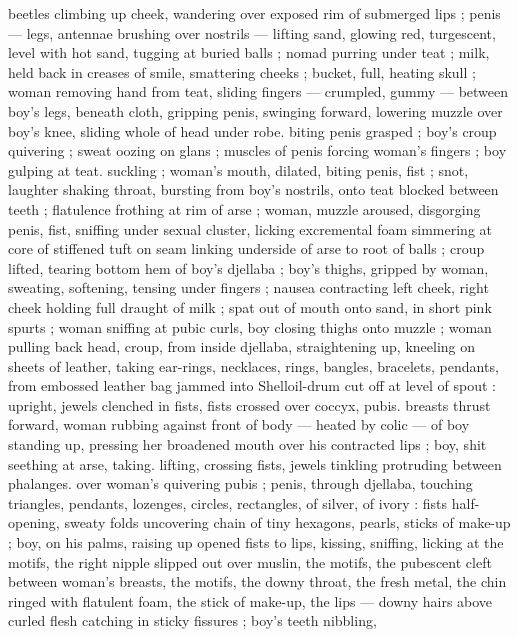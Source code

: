beetles climbing up cheek, wandering over exposed rim of 
submerged lips ; penis --- legs, antennae brushing over nostrils --- 
lifting sand, glowing red, turgescent, level with hot sand, tugging at 
buried balls ; nomad purring under teat ; milk, held back in creases 
of smile, smattering cheeks ; bucket, full, heating skull ; woman 
removing hand from teat, sliding fingers --- crumpled, gummy --- 
between boy's legs, beneath cloth, gripping penis, swinging forward, 
lowering muzzle over boy's knee, sliding whole of head under robe. 
biting penis grasped ; boy's croup quivering ; sweat oozing on glans 
; muscles of penis forcing woman's fingers ; boy gulping at teat. 
suckling ; woman's mouth, dilated, biting penis, fist ; snot, laughter 
shaking throat, bursting from boy's nostrils, onto teat blocked 
between teeth ; flatulence frothing at rim of arse ; woman, muzzle 
aroused, disgorging penis, fist, sniffing under sexual cluster, licking 
excremental foam simmering at core of stiffened tuft on seam linking 
underside of arse to root of balls ; croup lifted, tearing bottom hem 
of boy's djellaba ; boy's thighs, gripped by woman, sweating, 
softening, tensing under fingers ; nausea contracting left cheek, right 
cheek holding full draught of milk ; spat out of mouth onto sand, in 
short pink spurts ; woman sniffing at pubic curls, boy closing thighs 
onto muzzle ; woman pulling back head, croup, from inside djellaba, 
straightening up, kneeling on sheets of leather, taking ear-rings, 
necklaces, rings, bangles, bracelets, pendants, from embossed 
leather bag jammed into Shell\textregistered oil-drum cut off at level of spout : 
upright, jewels clenched in fists, fists crossed over coccyx, pubis. 
breasts thrust forward, woman rubbing against front of body --- 
heated by colic --- of boy standing up, pressing her broadened 
mouth over his contracted lips ; boy, shit seething at arse, taking. 
lifting, crossing fists, jewels tinkling protruding between phalanges. 
over woman's quivering pubis ; penis, through djellaba, touching 
triangles, pendants, lozenges, circles, rectangles, of silver, of ivory : 
fists half-opening, sweaty folds uncovering chain of tiny hexagons, 
pearls, sticks of make-up ; boy, on his palms, raising up opened fists 
to lips, kissing, sniffing, licking at the motifs, the right nipple slipped 
out over muslin, the motifs, the pubescent cleft between woman's 
breasts, the motifs, the downy throat, the fresh metal, the chin ringed 
with flatulent foam, the stick of make-up, the lips --- downy hairs 
above curled flesh catching in sticky fissures ; boy's teeth nibbling, 
